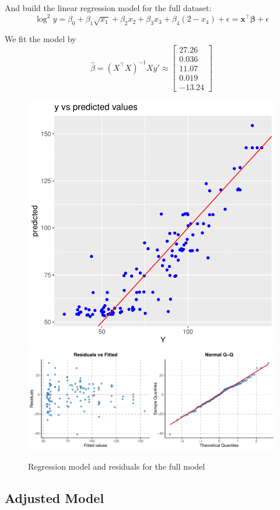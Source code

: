 And build the linear regression model for the full dataset:
\begin{equation} \label{eq:mlr}
    \log^2 y = \beta_0 +\beta_1 \sqrt{x_1} + \beta_2 x_2 +\beta_3 x_3 + \beta_4 (2 - x_4) + \epsilon = \boldsymbol{x}^\top\boldsymbol{\beta} + \epsilon
\end{equation}

We fit the model by
\begin{equation}
\hat{\beta} = (X^\top X)^{-1}Xy'\approx\begin{bmatrix}
    27.26 \\ 0.036 \\ 11.07 \\ 0.019 \\ -13.24
\end{bmatrix}
\end{equation}

\begin{figure}
    \centering
    \includegraphics[width=0.5\linewidth]{figures/mlr/y_vs_predicted_values_full_model.pdf}
    \includegraphics[width=1\linewidth]{figures/mlr/residuals_vs_fitted_qqplot.pdf}
    \caption{Regression model and residuals for the full model}
    \label{fig:full_mlr}
\end{figure}

\subsection{Adjusted Model}

